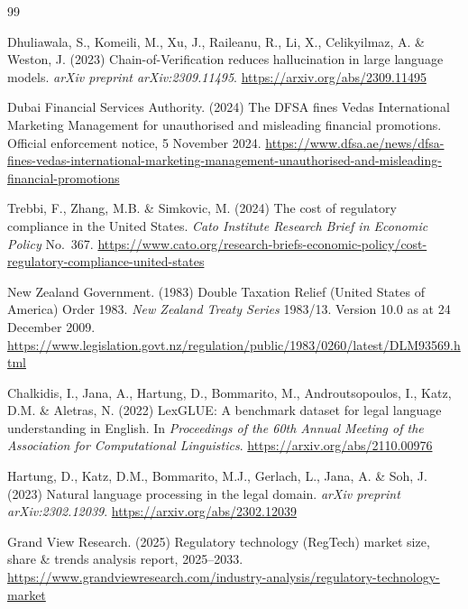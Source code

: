 \documentclass{article}
\begin{document}
\begin{thebibliography}{99}\small


Dhuliawala, S., Komeili, M., Xu, J., Raileanu, R., Li, X., Celikyilmaz, A.
\& Weston, J. (2023) Chain-of-Verification reduces hallucination in large
language models. \emph{arXiv preprint arXiv:2309.11495}.
\url{https://arxiv.org/abs/2309.11495}

Dubai Financial Services Authority. (2024) The DFSA fines Vedas
International Marketing Management for unauthorised and misleading
financial promotions. Official enforcement notice, 5 November 2024.
\url{https://www.dfsa.ae/news/dfsa-fines-vedas-international-marketing-management-unauthorised-and-misleading-financial-promotions}

Trebbi, F., Zhang, M.B. \& Simkovic, M. (2024) The cost of regulatory
compliance in the United States. \emph{Cato Institute Research Brief in
Economic Policy} No.~367.
\url{https://www.cato.org/research-briefs-economic-policy/cost-regulatory-compliance-united-states}

New Zealand Government. (1983) Double Taxation Relief (United States of
America) Order 1983. \emph{New Zealand Treaty Series} 1983/13. Version
10.0 as at 24 December 2009.
\url{https://www.legislation.govt.nz/regulation/public/1983/0260/latest/DLM93569.html}

Chalkidis, I., Jana, A., Hartung, D., Bommarito, M., Androutsopoulos,
I., Katz, D.M. \& Aletras, N. (2022) LexGLUE: A benchmark dataset for
legal language understanding in English. In \emph{Proceedings of the 60th
Annual Meeting of the Association for Computational Linguistics}.
\url{https://arxiv.org/abs/2110.00976}

Hartung, D., Katz, D.M., Bommarito, M.J., Gerlach, L., Jana, A. \&
Soh, J. (2023) Natural language processing in the legal domain.
\emph{arXiv preprint arXiv:2302.12039}.
\url{https://arxiv.org/abs/2302.12039}

Grand View Research. (2025) Regulatory technology (RegTech) market size,
share \& trends analysis report, 2025--2033.
\url{https://www.grandviewresearch.com/industry-analysis/regulatory-technology-market}


\end{thebibliography}
\end{document}
